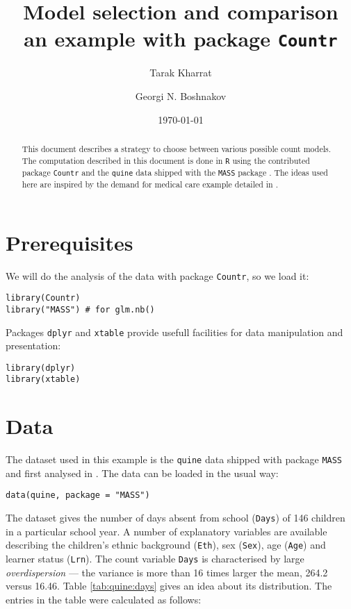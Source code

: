 \documentclass[a4paper,twoside,11pt]{article}
\author[1]{Tarak Kharrat}
\author[2]{Georgi N. Boshnakov}
\affil[1]{Salford Business School, University of Salford, UK.}
\affil[2]{School of Mathematics, University of Manchester, UK.}
\date{\today}
\title{Model selection and comparison\\\medskip
\large an example with package \texttt{Countr}}
\begin{document}
\maketitle
\begin{abstract}
This document describes a strategy to choose between various possible
count models. The computation described in this document is done in \texttt{R}
\citep{Rcore} using the contributed package \texttt{Countr} \citep{RpackageCountr} and
the \texttt{quine} data shipped with the \texttt{MASS} package \citep{Venables20102MASS}. The
ideas used here are inspired by the demand for medical care example detailed in
\citet[Section 6.3]{cameron2013regression}. 
\end{abstract}


\section{Prerequisites}
\label{sec:orga5a3f6d}

We will do the analysis of the data with package \texttt{Countr}, so we load it:
\begin{verbatim}
library(Countr)
library("MASS") # for glm.nb()
\end{verbatim}

Packages \texttt{dplyr} \citep{dplyr2016} and \texttt{xtable} \citep{xtable2016} provide
usefull facilities for data manipulation and presentation:
\begin{verbatim}
library(dplyr) 
library(xtable)
\end{verbatim}

\section{Data}
\label{sec:org9e0589a}

The dataset used in this example is the \texttt{quine} data shipped with 
package \texttt{MASS} \citep{Venables20102MASS} and first analysed in
\citet{aitkin1978analysis}. The data can be loaded in the usual way:
\begin{verbatim}
data(quine, package = "MASS")
\end{verbatim}

The dataset gives the number of days absent from school (\texttt{Days}) of
146
children in a particular school year. A number of
explanatory variables are available describing the children's ethnic background
(\texttt{Eth}), sex (\texttt{Sex}), age (\texttt{Age}) and learner status
(\texttt{Lrn}).  The count variable \texttt{Days} is characterised by large
\emph{overdispersion} --- the variance is more than
16 times larger the mean, 
264.2
versus 
16.46.
Table \ref{tab:quine:days} gives an idea about its
distribution. The entries in the table were calculated as follows:
\end{document}
